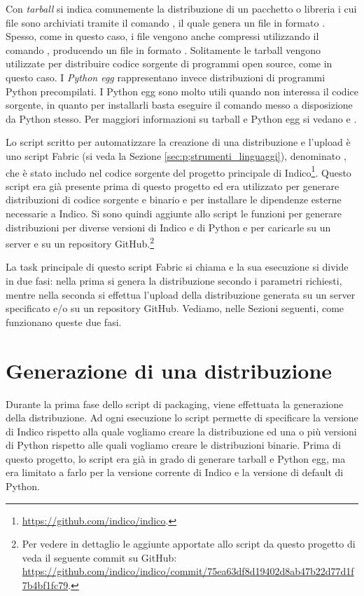     Con \textit{tarball} si indica comunemente la distribuzione di un pacchetto o libreria i cui file sono archiviati tramite il comando , il quale genera un file in formato . Spesso, come in questo caso, i file  vengono anche compressi utilizzando il comando , producendo un file in formato . Solitamente le tarball vengono utilizzate per distribuire codice sorgente di programmi open source, come in questo caso. I \textit{Python egg} rappresentano invece distribuzioni di programmi Python precompilati. I Python egg sono molto utili quando non interessa il codice sorgente, in quanto per installarli basta eseguire il comando  messo a disposizione da Python stesso. Per maggiori informazioni su tarball e Python egg si vedano \cite{scholz:egg} e \cite{wiki:tar}.
    
    Lo script scritto per automatizzare la creazione di una distribuzione e l'upload è uno script Fabric (si veda la Sezione \ref{sec:p;strumenti_linguaggi}), denominato , che è stato includo nel codice sorgente del progetto principale di Indico\footnote{\url{https://github.com/indico/indico}.}. Questo script era già presente prima di questo progetto ed era utilizzato per generare distribuzioni di codice sorgente e binario e per installare le dipendenze esterne necessarie a Indico. Si sono quindi aggiunte allo script le funzioni per generare distribuzioni per diverse versioni di Indico e di Python e per caricarle su un server e su un repository GitHub.\footnote{Per vedere in dettaglio le aggiunte apportate allo script da questo progetto di veda il seguente commit su GitHub: \url{https://github.com/indico/indico/commit/75ea63df8d19402d8ab47b22d77d1f7b4bf1fc79}.}
    
    La task principale di questo script Fabric si chiama  e la sua esecuzione si divide in due fasi: nella prima si genera la distribuzione secondo i parametri richiesti, mentre nella seconda si effettua l'upload della distribuzione generata su un server specificato e/o su un repository GitHub. Vediamo, nelle Sezioni seguenti, come funzionano queste due fasi.
    
    \section{Generazione di una distribuzione} \label{sec:dp;generazione_distribuzione}
    
        Durante la prima fase dello script di packaging, viene effettuata la generazione della distribuzione. Ad ogni esecuzione lo script permette di specificare la versione di Indico rispetto alla quale vogliamo creare la distribuzione ed una o più versioni di Python rispetto alle quali vogliamo creare le distribuzioni binarie. Prima di questo progetto, lo script era già in grado di generare tarball e Python egg, ma era limitato a farlo per la versione corrente di Indico e la versione di default di Python.
        
